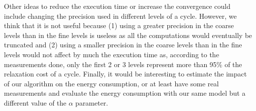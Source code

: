 \documentclass[sigplan]{acmart}
\begin{document}
   Other ideas to reduce the execution time or increase the convergence could include changing the precision used in different levels of a cycle. However, we think that it is not
   useful because (1) using a greater precision in the coarse levels than in the fine levels is useless as all the computations would eventually be truncated and (2) using a smaller
   precision in the coarse levels than in the fine levels would not affect by much the execution time as, according to the measurements done, only the first 2 or 3 levels represent more than 95\% of the relaxation cost of a cycle.
   Finally, it would be interesting to estimate the impact of our algorithm on the energy consumption, or at least have some real measurements and evaluate the energy consumption with our
   same model but a different value of the $\alpha$ parameter.
   
   
   
\end{document}
